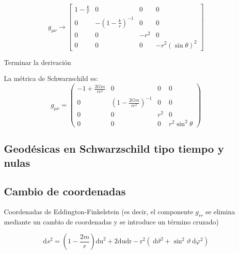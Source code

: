 \begin{equation}
    g_{\mu \nu} \rightarrow\left[\begin{array}{cccc}
            1-\frac{k}{r} & 0                                & 0    & 0                   \\
            0             & -\left(1-\frac{k}{r}\right)^{-1} & 0    & 0                   \\
            0             & 0                                & -r^2 & 0                   \\
            0             & 0                                & 0    & -r^2(\sin \theta)^2
        \end{array}\right]
\end{equation}

\begin{task}{}{}
    Terminar la derivación
\end{task}
La métrica de Schwarzschild es:
\begin{equation}
    \boxed{g_{\mu \nu}=\left(\begin{array}{cccc}
        -1+\frac{2 G m}{r c^2} & 0 & 0 & 0 \\
        0 & \left(1-\frac{2 G m}{r c^2}\right)^{-1} & 0 & 0 \\
        0 & 0 & r^2 & 0 \\
        0 & 0 & 0 & r^2 \sin ^2 \theta
        \end{array}\right)}
    \end{equation}
\subsection{Geodésicas en Schwarzschild tipo tiempo y nulas}

\subsection{Cambio de coordenadas}
Coordenadas de Eddington-Finkelstein (es decir, el componente $g_{r r}$ se elimina mediante un cambio de coordenadas y se introduce un término cruzado)

$$
\mathrm{d} s^2=\left(1-\frac{2 m}{r}\right) \mathrm{du}^2+2 \mathrm{dudr}-\mathrm{r}^2\left(\mathrm{~d} \vartheta^2+\sin ^2 \vartheta \mathrm{~d} \varphi^2\right)
$$

